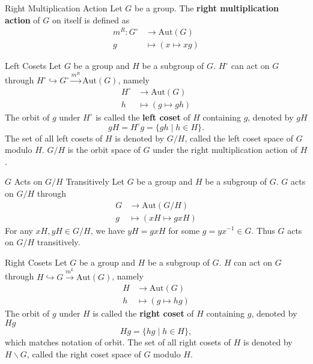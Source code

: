\begin{example}{Right Multiplication Action}{}
    Let $G$ be a group. The \textbf{right multiplication action} of $G$ on itself is defined as
    \begin{align*}
        m^R:G^\circ & \longrightarrow \mathrm{Aut}(G) \\
        g           & \longmapsto ( x\longmapsto xg)
    \end{align*}
\end{example}

\begin{definition}{Left Cosets}{}
    Let $G$ be a group and $H$ be a subgroup of $G$. $H^\circ$ can act on $G$ through $H^\circ\hookrightarrow G^\circ\stackrel{m^R}{\longrightarrow} \mathrm{Aut}(G)$, namely
    \begin{align*}
        H^\circ & \longrightarrow \mathrm{Aut}(G) \\
        h       & \longmapsto  (g\longmapsto gh)
    \end{align*}
    The orbit of $g$ under $H^\circ$ is called the \textbf{left coset} of $H$ containing $g$, denoted by $gH$
    \[
        gH = H^\circ g = \{ gh\mid h\in H\}.
    \]
    The set of all left cosets of $H$ is denoted by $G/H$, called the left coset space of $G$ modulo $H$. $G/H$ is the orbit space of $G$ under the right multiplication action of $H$.
\end{definition}

\begin{example}{$G$ Acts on $G/H$ Transitively}{}
    Let $G$ be a group and $H$ be a subgroup of $G$. $G$ acts on $G/H$ through
    \begin{align*}
        G & \longrightarrow \mathrm{Aut}(G/H) \\
        g & \longmapsto  (xH\longmapsto gxH)
    \end{align*}
    For any $xH,yH\in G/H$, we have $yH=gxH$ for some $g=yx^{-1}\in G$. Thus $G$ acts on $G/H$ transitively.
\end{example}

\begin{definition}{Right Cosets}{}
    Let $G$ be a group and $H$ be a subgroup of $G$. $H$ can act on $G$ through $H\hookrightarrow G\stackrel{m^L}{\longrightarrow} \mathrm{Aut}(G)$, namely
    \begin{align*}
        H & \longrightarrow \mathrm{Aut}(G) \\
        h & \longmapsto  (g\longmapsto hg)
    \end{align*}
    The orbit of $g$ under $H$ is called the \textbf{right coset} of $H$ containing $g$, denoted by $Hg$
    \[
        Hg = \{ hg\mid h\in H\},
    \]
    which matches notation of orbit. The set of all right cosets of $H$ is denoted by $H\backslash G$, called the right coset space of $G$ modulo $H$.
\end{definition}

